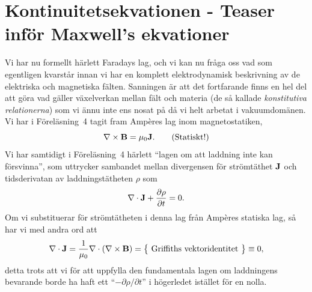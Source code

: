 \section{Kontinuitetsekvationen - Teaser inf{\"o}r Maxwell's ekvationer}
Vi har nu formellt h{\"a}rlett Faradays lag, och vi kan nu fr{\aa}ga oss vad
som egentligen kvarst{\aa}r innan vi har en komplett elektrodynamisk
beskrivning av de elektriska och magnetiska f{\"a}lten. Sanningen {\"a}r att
det fortfarande finns en hel del att g{\"o}ra vad g{\"a}ller v{\"a}xelverkan
mellan f{\"a}lt och materia (de s{\aa} kallade {\it konstitutiva relationerna})
som vi {\"a}nnu inte ens nosat p{\aa} d{\aa} vi helt arbetat i
vakuumdom{\"a}nen.
Vi har i F{\"o}rel{\"a}sning~4 tagit fram Amp\`eres lag inom magnetostatiken,
$$
  \nabla\times{\bf B}=\mu_0{\bf J}.\qquad\hbox{(Statiskt!)}
$$
Vi har samtidigt i F{\"o}rel{\"a}sning~4 h{\"a}rlett ``lagen om att laddning
inte kan f{\"o}rsvinna'', som uttrycker sambandet mellan divergensen f{\"o}r
str{\"o}mt{\"a}thet ${\bf J}$ och tidsderivatan av laddningst{\"a}theten
$\rho$ som
$$
  \nabla\cdot{\bf J}+{{\partial\rho}\over{\partial t}}=0.
$$
Om vi substituerar f{\"o}r str{\"o}mt{\"a}theten i denna lag fr{\aa}n
Amp\`eres statiska lag, s{\aa} har vi med andra ord att
$$
  \nabla\cdot{\bf J}
    ={{1}\over{\mu_0}}\nabla\cdot(\nabla\times{\bf B})
    =\big\{\hbox{ Griffiths vektoridentitet }\big\}
    \equiv 0,
$$
detta trots att vi f{\"o}r att uppfylla den fundamentala lagen om laddningens
bevarande borde ha haft ett ``$-{{\partial\rho}/{\partial t}}$'' i
h{\"o}gerledet ist{\"a}llet f{\"o}r en nolla.

